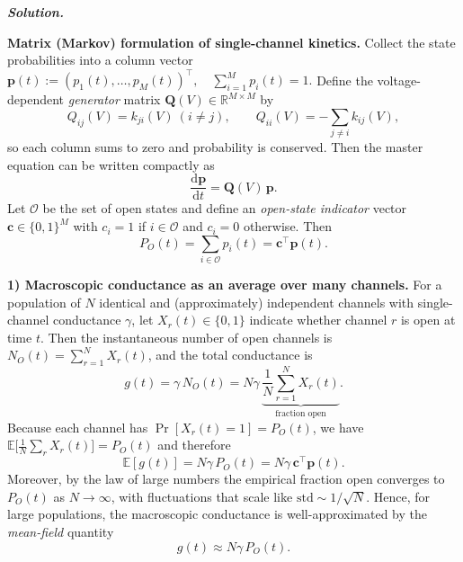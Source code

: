 \documentclass{article}
\newif\ifsolutionclearpage
\newenvironment{solution}{%
    \ifsolutionclearpage\clearpage\fi
    \global\solutionclearpagetrue
    \par\noindent\begin{solutionbox}\textbf{\textit{Solution.}}\par\medskip\itshape
}{%
    \end{solutionbox}
}
\renewenvironment{equation}{\begin{equation*}}{\end{equation*}}
\begin{document}
\begin{solution}
\textbf{Matrix (Markov) formulation of single-channel kinetics.}
Collect the state probabilities into a column vector
\(
\mathbf p(t):=(p_1(t),\dots,p_M(t))^\top,\quad \sum_{i=1}^M p_i(t)=1.
\)
Define the voltage-dependent \emph{generator} matrix \(\mathbf Q(V)\in\mathbb R^{M\times M}\) by
\[
Q_{ij}(V)=k_{ji}(V)\ (i\neq j),\qquad
Q_{ii}(V)=-\sum_{j\neq i}k_{ij}(V),
\]
so each column sums to zero and probability is conserved. Then the master equation can be written compactly as
\begin{equation}
\frac{\mathrm d\mathbf p}{\mathrm dt}=\mathbf Q(V)\,\mathbf p.
\end{equation}
Let \(\mathcal O\) be the set of open states and define an \emph{open-state indicator} vector \(\mathbf c\in\{0,1\}^M\) with
\(c_i=1\) if \(i\in\mathcal O\) and \(c_i=0\) otherwise. Then
\begin{equation}
P_O(t)=\sum_{i\in\mathcal O}p_i(t)=\mathbf c^\top \mathbf p(t).
\end{equation}

\textbf{1) Macroscopic conductance as an average over many channels.}
For a population of \(N\) identical and (approximately) independent channels with single-channel conductance \(\gamma\), let \(X_r(t)\in\{0,1\}\) indicate whether channel \(r\) is open at time \(t\).
Then the instantaneous number of open channels is \(N_O(t)=\sum_{r=1}^N X_r(t)\), and the total conductance is
\begin{equation}
g(t)=\gamma\,N_O(t)=N\gamma\,\underbrace{\frac{1}{N}\sum_{r=1}^N X_r(t)}_{\text{fraction open}}.
\end{equation}
Because each channel has \(\Pr[X_r(t)=1]=P_O(t)\), we have
\(
\mathbb E\bigl[\tfrac{1}{N}\sum_r X_r(t)\bigr]=P_O(t)
\)
and therefore
\begin{equation}
\mathbb E[g(t)]=N\gamma\,P_O(t)=N\gamma\,\mathbf c^\top\mathbf p(t).
\end{equation}
Moreover, by the law of large numbers the empirical fraction open converges to \(P_O(t)\) as \(N\to\infty\), with fluctuations that scale like \(\mathrm{std}\sim 1/\sqrt{N}\). Hence, for large populations, the macroscopic conductance is well-approximated by the \emph{mean-field} quantity
\begin{equation}
g(t)\approx N\gamma\,P_O(t).
\end{equation}


\end{solution}
\end{document}
